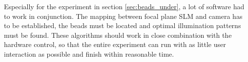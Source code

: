 Especially for the experiment in section \ref{sec:beads_under}, a lot
of software had to work in conjunction. The mapping between focal
plane SLM and camera has to be established, the beads must be located
and optimal illumination patterns must be found. These algorithms
should work in close combination with the hardware control, so that
the entire experiment can run with as little user interaction as
possible and finish within reasonable time.


